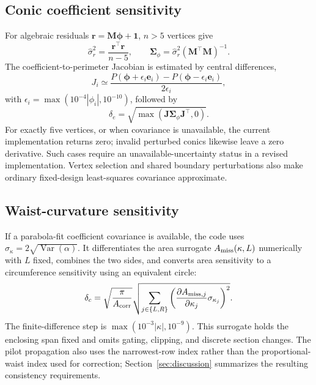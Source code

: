 \documentclass[11pt,a4paper]{article}
\numberwithin{equation}{section}
\begin{document}
\subsection{Conic coefficient sensitivity}
For algebraic residuals $\mathbf r=\mathbf M\boldsymbol\phi+\mathbf1$, $n>5$ vertices give
\begin{equation}
\hat\sigma_r^2=\frac{\mathbf r^\top\mathbf r}{n-5},\qquad
\mathbf\Sigma_\phi=\hat\sigma_r^2(\mathbf M^\top\mathbf M)^{-1}.
\end{equation}
The coefficient-to-perimeter Jacobian is estimated by central differences,
\begin{equation}
J_i\simeq\frac{P(\boldsymbol\phi+\epsilon_i\mathbf e_i)-P(\boldsymbol\phi-\epsilon_i\mathbf e_i)}{2\epsilon_i},
\end{equation}
with $\epsilon_i=\max(10^{-4}|\phi_i|,10^{-10})$, followed by
\begin{equation}
\delta_e=\sqrt{\max(\mathbf J\mathbf\Sigma_\phi\mathbf J^\top,0)}.
\end{equation}
For exactly five vertices, or when covariance is unavailable, the current implementation returns zero; invalid perturbed conics likewise leave a zero derivative. Such cases require an unavailable-uncertainty status in a revised implementation. Vertex selection and shared boundary perturbations also make ordinary fixed-design least-squares covariance approximate.

\subsection{Waist-curvature sensitivity}
If a parabola-fit coefficient covariance is available, the code uses $\sigma_\kappa=2\sqrt{\operatorname{Var}(\alpha)}$. It differentiates the area surrogate $A_{\rm miss}(\kappa,L)$ numerically with $L$ fixed, combines the two sides, and converts area sensitivity to a circumference sensitivity using an equivalent circle:
\begin{equation}
\delta_c=\sqrt{\frac\pi{A_{\rm corr}}}
\sqrt{\sum_{j\in\{L,R\}}\left(\frac{\partial A_{{\rm miss},j}}{\partial\kappa_j}\sigma_{\kappa_j}\right)^2}.
\end{equation}
The finite-difference step is $\max(10^{-3}|\kappa|,10^{-9})$. This surrogate holds the enclosing span fixed and omits gating, clipping, and discrete section changes. The pilot propagation also uses the narrowest-row index rather than the proportional-waist index used for correction; Section~\ref{sec:discussion} summarizes the resulting consistency requirements.
\end{document}

